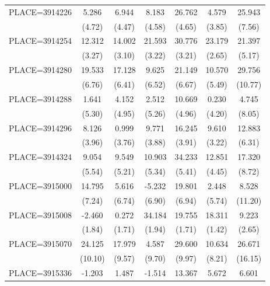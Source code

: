 {\begin{tabular}{l*{6}{c}}
PLACE=3914226       &       5.286&       6.944&       8.183&      26.762&       4.579&      25.943\\
                    &      (4.72)&      (4.47)&      (4.58)&      (4.65)&      (3.85)&      (7.56)\\
PLACE=3914254       &      12.312&      14.002&      21.593&      30.776&      23.179&      21.397\\
                    &      (3.27)&      (3.10)&      (3.22)&      (3.21)&      (2.65)&      (5.17)\\
PLACE=3914280       &      19.533&      17.128&       9.625&      21.149&      10.570&      29.756\\
                    &      (6.76)&      (6.41)&      (6.52)&      (6.67)&      (5.49)&     (10.77)\\
PLACE=3914288       &       1.641&       4.152&       2.512&      10.669&       0.230&       4.745\\
                    &      (5.30)&      (4.95)&      (5.26)&      (4.96)&      (4.20)&      (8.05)\\
PLACE=3914296       &       8.126&       0.999&       9.771&      16.245&       9.610&      12.883\\
                    &      (3.96)&      (3.76)&      (3.88)&      (3.91)&      (3.22)&      (6.31)\\
PLACE=3914324       &       9.054&       9.549&      10.903&      34.233&      12.851&      17.320\\
                    &      (5.54)&      (5.21)&      (5.34)&      (5.41)&      (4.45)&      (8.72)\\
PLACE=3915000       &      14.795&       5.616&      -5.232&      19.801&       2.448&       8.528\\
                    &      (7.24)&      (6.74)&      (6.90)&      (6.94)&      (5.74)&     (11.20)\\
PLACE=3915008       &      -2.460&       0.272&      34.184&      19.755&      18.311&       9.223\\
                    &      (1.84)&      (1.71)&      (1.94)&      (1.71)&      (1.42)&      (2.65)\\
PLACE=3915070       &      24.125&      17.979&       4.587&      29.600&      10.634&      26.671\\
                    &     (10.10)&      (9.57)&      (9.70)&      (9.97)&      (8.21)&     (16.15)\\
PLACE=3915336       &      -1.203&       1.487&      -1.514&      13.367&       5.672&       6.601\\

\end{tabular}}
